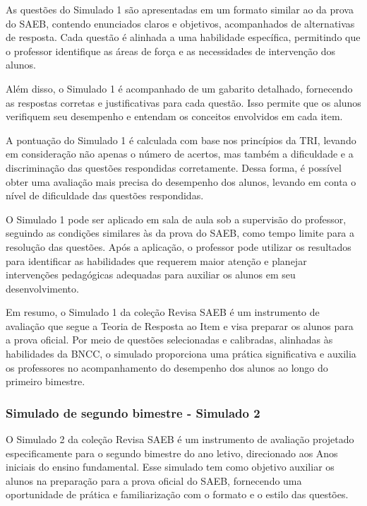 As questões do Simulado 1 são apresentadas em um formato similar ao da
prova do SAEB, contendo enunciados claros e objetivos, acompanhados de
alternativas de resposta. Cada questão é alinhada a uma habilidade
específica, permitindo que o professor identifique as áreas de força e
as necessidades de intervenção dos alunos.

Além disso, o Simulado 1 é acompanhado de um gabarito detalhado,
fornecendo as respostas corretas e justificativas para cada questão.
Isso permite que os alunos verifiquem seu desempenho e entendam os
conceitos envolvidos em cada item.

A pontuação do Simulado 1 é calculada com base nos princípios da TRI,
levando em consideração não apenas o número de acertos, mas também a
dificuldade e a discriminação das questões respondidas corretamente.
Dessa forma, é possível obter uma avaliação mais precisa do desempenho
dos alunos, levando em conta o nível de dificuldade das questões
respondidas.

O Simulado 1 pode ser aplicado em sala de aula sob a supervisão do
professor, seguindo as condições similares às da prova do SAEB, como
tempo limite para a resolução das questões. Após a aplicação, o
professor pode utilizar os resultados para identificar as habilidades
que requerem maior atenção e planejar intervenções pedagógicas adequadas
para auxiliar os alunos em seu desenvolvimento.

Em resumo, o Simulado 1 da coleção Revisa SAEB é um instrumento de avaliação que segue
a Teoria de Resposta ao Item e visa preparar os alunos para a prova
oficial. Por meio de questões selecionadas e calibradas, alinhadas às
habilidades da BNCC, o simulado proporciona uma prática significativa e
auxilia os professores no acompanhamento do desempenho dos alunos ao
longo do primeiro bimestre.

\subsubsection{Simulado de segundo bimestre - Simulado
2}\label{simulado-de-segundo-bimestre---simulado-2}

O Simulado 2 da coleção Revisa SAEB é um instrumento de avaliação projetado
especificamente para o segundo bimestre do ano letivo, direcionado aos
Anos iniciais do ensino fundamental. Esse simulado tem como objetivo
auxiliar os alunos na preparação para a prova oficial do SAEB,
fornecendo uma oportunidade de prática e familiarização com o formato e
o estilo das questões.

